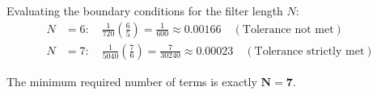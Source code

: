 \documentclass[11pt, a4paper]{article}
\begin{document}
\noindent Evaluating the boundary conditions for the filter length $N$:
\begin{align}
    N &= 6: \quad \frac{1}{720} \left( \frac{6}{5} \right) = \frac{1}{600} \approx 0.00166 \quad (\text{Tolerance not met}) \\
    N &= 7: \quad \frac{1}{5040} \left( \frac{7}{6} \right) = \frac{7}{30240} \approx 0.00023 \quad (\text{Tolerance strictly met})
\end{align}

\vspace{0.3cm}

\noindent The minimum required number of terms is exactly $\mathbf{N = 7}$.
\end{document}
